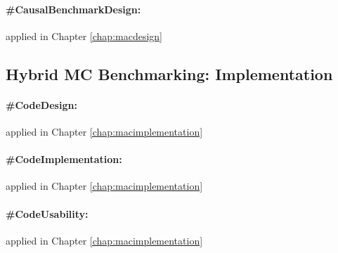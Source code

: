 \documentclass[./main.tex]{subfiles}
\begin{document}
\paragraph*{\textbf{\#CausalBenchmarkDesign:}}\label{lo:CausalBenchmarkDesign} applied in Chapter \ref{chap:macdesign}

\subsection{Hybrid MC Benchmarking: Implementation}
\paragraph*{\textbf{\#CodeDesign:}}\label{lo:CodeDesign} applied in Chapter \ref{chap:macimplementation}
\paragraph*{\textbf{\#CodeImplementation:}}\label{lo:CodeImplementation} applied in Chapter \ref{chap:macimplementation}
\paragraph*{\textbf{\#CodeUsability:}}\label{lo:CodeUsability} applied in Chapter \ref{chap:macimplementation}
\end{document}
